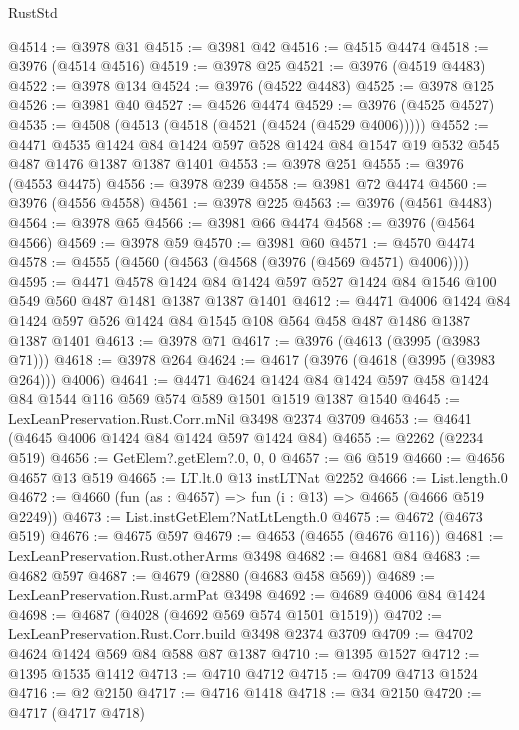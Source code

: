 \begin{lexlean}{RustStd}
\begin{coremodule}
@4514 := @3978 @31
@4515 := @3981 @42
@4516 := @4515 @4474
@4518 := @3976 (@4514 @4516)
@4519 := @3978 @25
@4521 := @3976 (@4519 @4483)
@4522 := @3978 @134
@4524 := @3976 (@4522 @4483)
@4525 := @3978 @125
@4526 := @3981 @40
@4527 := @4526 @4474
@4529 := @3976 (@4525 @4527)
@4535 := @4508 (@4513 (@4518 (@4521 (@4524 (@4529 @4006)))))
@4552 := @4471
    @4535
    @1424
    @84
    @1424
    @597
    @528
    @1424
    @84
    @1547
    @19
    @532
    @545
    @487
    @1476
    @1387
    @1387
    @1401
@4553 := @3978 @251
@4555 := @3976 (@4553 @4475)
@4556 := @3978 @239
@4558 := @3981 @72 @4474
@4560 := @3976 (@4556 @4558)
@4561 := @3978 @225
@4563 := @3976 (@4561 @4483)
@4564 := @3978 @65
@4566 := @3981 @66 @4474
@4568 := @3976 (@4564 @4566)
@4569 := @3978 @59
@4570 := @3981 @60
@4571 := @4570 @4474
@4578 := @4555 (@4560 (@4563 (@4568 (@3976 (@4569 @4571) @4006))))
@4595 := @4471
    @4578
    @1424
    @84
    @1424
    @597
    @527
    @1424
    @84
    @1546
    @100
    @549
    @560
    @487
    @1481
    @1387
    @1387
    @1401
@4612 := @4471
    @4006
    @1424
    @84
    @1424
    @597
    @526
    @1424
    @84
    @1545
    @108
    @564
    @458
    @487
    @1486
    @1387
    @1387
    @1401
@4613 := @3978 @71
@4617 := @3976 (@4613 (@3995 (@3983 @71)))
@4618 := @3978 @264
@4624 := @4617 (@3976 (@4618 (@3995 (@3983 @264))) @4006)
@4641 := @4471
    @4624
    @1424
    @84
    @1424
    @597
    @458
    @1424
    @84
    @1544
    @116
    @569
    @574
    @589
    @1501
    @1519
    @1387
    @1540
@4645 := LexLeanPreservation.Rust.Corr.mNil @3498 @2374 @3709
@4653 := @4641 (@4645 @4006 @1424 @84 @1424 @597 @1424 @84)
@4655 := @2262 (@2234 @519)
@4656 := GetElem?.getElem?.{0, 0, 0}
@4657 := @6 @519
@4660 := @4656 @4657 @13 @519
@4665 := LT.lt.{0} @13 instLTNat @2252
@4666 := List.length.{0}
@4672 := @4660 (fun (as : @4657) => fun (i : @13) => @4665 (@4666 @519 @2249))
@4673 := List.instGetElem?NatLtLength.{0}
@4675 := @4672 (@4673 @519)
@4676 := @4675 @597
@4679 := @4653 (@4655 (@4676 @116))
@4681 := LexLeanPreservation.Rust.otherArms @3498
@4682 := @4681 @84
@4683 := @4682 @597
@4687 := @4679 (@2880 (@4683 @458 @569))
@4689 := LexLeanPreservation.Rust.armPat @3498
@4692 := @4689 @4006 @84 @1424
@4698 := @4687 (@4028 (@4692 @569 @574 @1501 @1519))
@4702 := LexLeanPreservation.Rust.Corr.build @3498 @2374 @3709
@4709 := @4702 @4624 @1424 @569 @84 @588 @87 @1387
@4710 := @1395 @1527
@4712 := @1395 @1535 @1412
@4713 := @4710 @4712
@4715 := @4709 @4713 @1524
@4716 := @2 @2150
@4717 := @4716 @1418
@4718 := @34 @2150
@4720 := @4717 (@4717 @4718)

\end{coremodule}
\end{lexlean}
